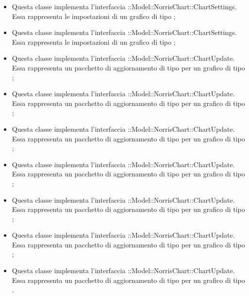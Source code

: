 \begin{itemize}
		\item {} Questa classe implementa l'interfaccia \linebreak {}::Model::NorrisChart::ChartSettings. Essa rappresenta le impostazioni di un grafico di tipo ;

		\item {} Questa classe implementa l'interfaccia \linebreak {}::Model::NorrisChart::ChartSettings. Essa rappresenta le impostazioni di un grafico di tipo ;

		\item {} Questa classe implementa l'interfaccia ::Model::NorrisChart::ChartUpdate. Essa rappresenta un pacchetto di aggiornamento di tipo  per un grafico di tipo ;

		\item {} Questa classe implementa l'interfaccia ::Model::NorrisChart::ChartUpdate. Essa rappresenta un pacchetto di aggiornamento di tipo  per un grafico di tipo ;

		\item {} Questa classe implementa l'interfaccia ::Model::NorrisChart::ChartUpdate. Essa rappresenta un pacchetto di aggiornamento di tipo  per un grafico di tipo ;

		\item {} Questa classe implementa l'interfaccia ::Model::NorrisChart::ChartUpdate. Essa rappresenta un pacchetto di aggiornamento di tipo  per un grafico di tipo ;

		\item {} Questa classe implementa l'interfaccia ::Model::NorrisChart::ChartUpdate. Essa rappresenta un pacchetto di aggiornamento di tipo  per un grafico di tipo ;

		\item {} Questa classe implementa l'interfaccia ::Model::NorrisChart::ChartUpdate. Essa rappresenta un pacchetto di aggiornamento di tipo  per un grafico di tipo ;

		\item {} Questa classe implementa l'interfaccia ::Model::NorrisChart::ChartUpdate. Essa rappresenta un pacchetto di aggiornamento di tipo  per un grafico di tipo .
	\end{itemize}
